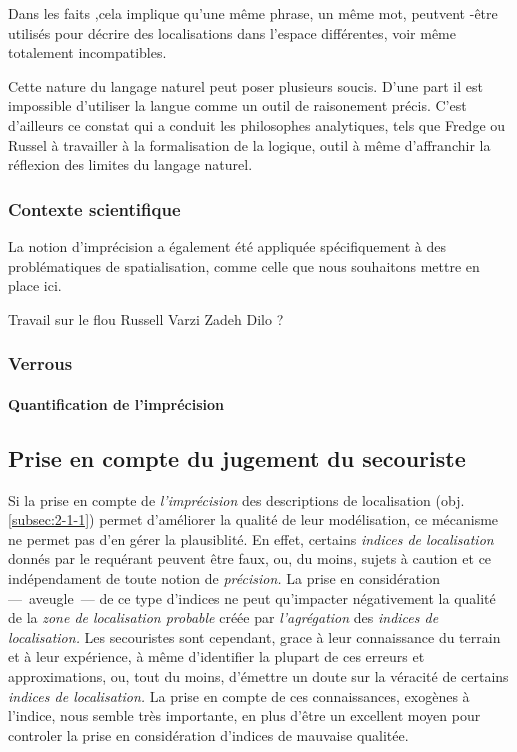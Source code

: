 Dans les faits ,cela implique qu'une même phrase, un même mot,
peutvent -être utilisés pour décrire des localisations dans l'espace
différentes, voir même totalement incompatibles.

Cette nature du langage naturel peut poser plusieurs soucis. D'une
part il est impossible d'utiliser la langue comme un outil de
raisonement précis. C'est d'ailleurs ce constat qui a conduit les
philosophes analytiques, tels que Fredge ou Russel à travailler à la
formalisation de la logique, outil à même d'affranchir la réflexion
des limites du langage naturel.



\subsubsection{Contexte scientifique}

La notion d'imprécision a également été appliquée spécifiquement à des
problématiques de spatialisation, comme celle que nous souhaitons
mettre en place ici.



Travail sur le flou
Russell
Varzi
Zadeh
Dilo ?


\subsubsection{Verrous}

\paragraph{Quantification de l'imprécision}

\subsection{Prise en compte du jugement du secouriste}
\label{subsec:2-1-3}

Si la prise en compte de \emph{l'imprécision} des descriptions de
localisation (obj. \ref{subsec:2-1-1}) permet d'améliorer la qualité
de leur modélisation, ce mécanisme ne permet pas d'en gérer la
plausiblité. En effet, certains \emph{indices de localisation} donnés
par le requérant peuvent être faux, ou, du moins, sujets à caution et
ce indépendament de toute notion de \emph{précision.} La prise en
considération ---~aveugle~--- de ce type d'indices ne peut qu'impacter
négativement la qualité de la \emph{zone de localisation probable}
créée par \emph{l'agrégation} des \emph{indices de localisation.} Les
secouristes sont cependant, grace à leur connaissance du terrain et à
leur expérience, à même d'identifier la plupart de ces erreurs et
approximations, ou, tout du moins, d’émettre un doute sur la véracité
de certains \emph{indices de localisation.} La prise en compte de ces
connaissances, exogènes à l'indice, nous semble très importante, en
plus d'être un excellent moyen pour controler la prise en
considération d'indices de mauvaise qualitée.

